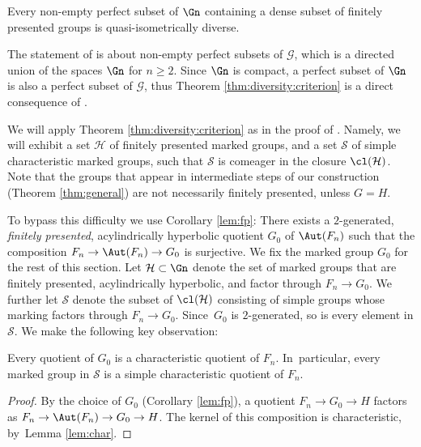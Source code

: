 \begin{theorem}
\label{thm:diversity:criterion}
Every non-empty perfect subset of $\Gn$ containing a dense subset of finitely presented groups is quasi-isometrically diverse.
\end{theorem}

\begin{remark}
The statement of \cite[Cor.\,1.2]{diversity} is about non-empty perfect subsets of $\mathcal{G}$, which is a directed union of the spaces $\Gn$ for $n \geq 2$. Since $\Gn$ is compact, a perfect subset of $\Gn$ is also a perfect subset of $\mathcal{G}$, thus Theorem \ref{thm:diversity:criterion} is a direct consequence of \cite[Cor.\,1.2]{diversity}.
\end{remark}

We will apply Theorem \ref{thm:diversity:criterion} as in the proof of \cite[Cor.\,4.10]{diversity}. Namely, we will exhibit a set $\mathcal{H}$ of finitely presented marked groups, and a set $\mathcal{S}$ of simple characteristic marked groups, such that $\mathcal{S}$ is comeager in the closure $\cl(\mathcal{H})$.
Note that the groups that appear in intermediate steps of our construction (Theorem \ref{thm:general}) are not necessarily finitely presented, unless $G = H$.

To bypass this difficulty we use Corollary \ref{lem:fp}: There exists a $2$-generated, \emph{finitely presented}, acylindrically hyperbolic quotient $G_0$ of $\Aut(F_n)$ such that the composition $F_n \to \Aut(F_n) \to G_0$ is surjective.
We fix the marked group $G_0$ for the rest of this section. Let $\mathcal{H} \subset \Gn$ denote the set of marked groups that are finitely presented, acylindrically hyperbolic, and factor through $F_n \to G_0$.
We further let $\mathcal{S}$ denote the subset of $\cl(\mathcal{H})$ consisting of simple groups whose marking factors through \hbox{$F_n \!\to\! G_0$}.
Since~$G_0$ is $2$-generated, so is every element in $\mathcal S$.
We make the following key observation:

\begin{lemma}
\label{lem:factor:char}
Every quotient of $G_0$ is a characteristic quotient of $F_n$. In~particular, every marked group in $\mathcal{S}$ is a simple characteristic quotient of $F_n$.
\end{lemma}

\begin{proof}
By the choice of $G_0$ (Corollary \ref{lem:fp}), a quotient $F_n \to G_0 \to H$ factors as $F_n \to \Aut(F_n) \to G_0 \to H$. The kernel of this composition is characteristic, by~Lemma \ref{lem:char}.
\end{proof}

